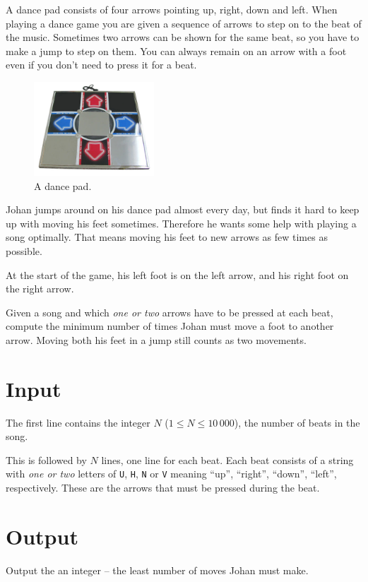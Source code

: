 A dance pad consists of four arrows pointing up, right, down and left.
When playing a dance game you are given a sequence of arrows to step on to the beat of the music.
Sometimes two arrows can be shown for the same beat, so you have to make a jump to step on them.
You can always remain on an arrow with a foot even if you don't need to press it for a beat.

\begin{figure}[ht!]
    \centering
    \includegraphics[width=0.4\textwidth]{dansmatta.png}
\caption{A dance pad.}
\label{fig:sample1}
\end{figure}

Johan jumps around on his dance pad almost every day, but finds it hard to keep up with moving his feet sometimes.
Therefore he wants some help with playing a song optimally.
That means moving his feet to new arrows as few times as possible.

At the start of the game, his left foot is on the left arrow, and his right foot on the right arrow.

Given a song and which \emph{one or two} arrows have to be pressed at each beat, compute the minimum number of times Johan must move a foot to another arrow.
Moving both his feet in a jump still counts as two movements.


\section*{Input}
The first line contains the integer $N$ ($1 \le N \le 10\,000$), the number of beats in the song.

This is followed by $N$ lines, one line for each beat.
Each beat consists of a string with \emph{one or two} letters of \texttt{U}, \texttt{H}, \texttt{N} or \texttt{V} meaning ``up'', ``right'', ``down'', ``left'', respectively.
These are the arrows that must be pressed during the beat.

\section*{Output}
Output the an integer -- the least number of moves Johan must make.

